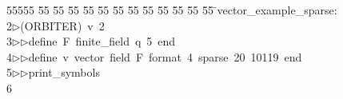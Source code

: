 %
%
\begin{tabbing}
55555 \= 55 \= 55 \= 55 \= 55 \= 55 \= 55 \= 55 \= 55 \= 55 \= 55 \= 55 \= 55 \= \>vector\_example\_sparse:\\[0pt]
2\>$\triangleright$\>(ORBITER)\ v\ 2\ \\[0pt]
3\>$\triangleright$\>$\triangleright$\>define\ F\ finite\_field\ q\ 5\ end\ \\[0pt]
4\>$\triangleright$\>$\triangleright$\>define\ v\ vector\ field\ F\ format\ 4\ sparse\ 20\ 10119\ end\ \\[0pt]
5\>$\triangleright$\>$\triangleright$\>print\_symbols\\[0pt]
6\>\end{tabbing}
